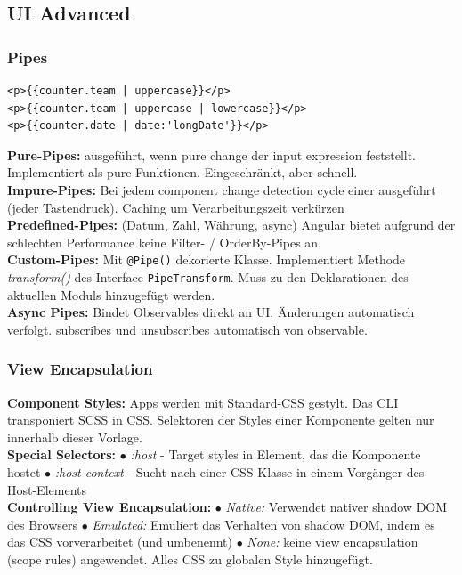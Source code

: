 \subsection{UI Advanced}

\subsubsection{Pipes}
\begin{lstlisting}
<p>{{counter.team | uppercase}}</p>
<p>{{counter.team | uppercase | lowercase}}</p>
<p>{{counter.date | date:'longDate'}}</p>
\end{lstlisting}
\textbf{Pure-Pipes:} ausgeführt, wenn pure change der input expression feststellt. Implementiert als pure Funktionen. Eingeschränkt, aber schnell.\\
\textbf{Impure-Pipes:} Bei jedem component change detection cycle einer ausgeführt (jeder Tastendruck). Caching um Verarbeitungszeit verkürzen\\
\textbf{Predefined-Pipes:} (Datum, Zahl, Währung, async)
Angular bietet aufgrund der schlechten Performance keine Filter- / OrderBy-Pipes an.\\
\textbf{Custom-Pipes:} Mit \texttt{\tiny @Pipe()} dekorierte Klasse. Implementiert Methode \textit{transform()} des Interface \texttt{\tiny PipeTransform}. Muss zu den Deklarationen des aktuellen Moduls hinzugefügt werden.\\
\textbf{Async Pipes:} Bindet Observables direkt an UI. Änderungen automatisch verfolgt. subscribes und unsubscribes automatisch von observable.

\subsubsection{View Encapsulation}
\textbf{Component Styles:}
Apps werden mit Standard-CSS gestylt. Das CLI transponiert SCSS in CSS. Selektoren der Styles einer Komponente gelten nur innerhalb dieser Vorlage.\\
\textbf{Special Selectors:}
$\bullet$ \textit{:host} - Target styles in Element, das die Komponente hostet
$\bullet$ \textit{:host-context} - Sucht nach einer CSS-Klasse in einem Vorgänger des Host-Elements\\
\textbf{Controlling View Encapsulation:}
$\bullet$ \textit{Native:} Verwendet nativer shadow DOM des Browsers
$\bullet$ \textit{Emulated:} Emuliert das Verhalten von shadow DOM, indem es das CSS vorverarbeitet (und umbenennt)
$\bullet$ \textit{None:} keine view encapsulation (scope rules) angewendet. Alles CSS zu globalen Style hinzugefügt.

